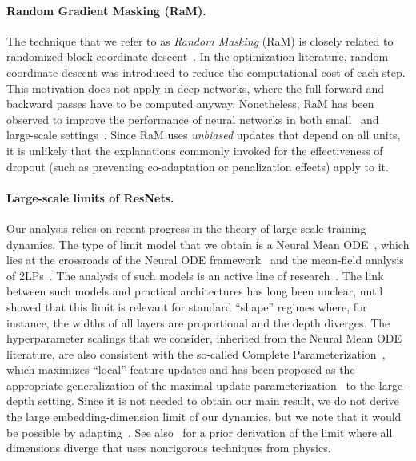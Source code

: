 \documentclass[a4paper,11pt]{article}
\newcommand{\1}{\mathbbm{1}}
\theoremstyle{definition}
\theoremstyle{remark}
\begin{document}
\paragraph{Random Gradient Masking (RaM).} 
The technique that we refer to as \emph{Random Masking} (RaM) is closely related to randomized block-coordinate descent~\cite{nesterov2012coordinatedescent,cotter2011betterminibatch,Wright2015CoordinateDA}. In the optimization literature, random coordinate descent was introduced to reduce the computational cost of each step. This motivation does not apply in deep networks, where the full forward and backward passes have to be computed anyway. Nonetheless, RaM has been observed to improve the performance of neural networks in both small~\cite{chizat2025phasediagramdropouttwolayer} and large-scale settings~\cite{joo2026surprisingeffectivenessmaskingupdates}. Since RaM uses \emph{unbiased} updates that depend on all units, it is unlikely that the explanations commonly invoked for the effectiveness of dropout (such as preventing co-adaptation or penalization effects) apply to it.

\paragraph{Large-scale limits of ResNets.}
Our analysis relies on recent progress in the theory of large-scale training dynamics. 
The type of limit model that we obtain is a Neural Mean ODE~\cite{lu2020meanfieldanalysisdeepresnet,ding2022mfresnets}, which lies at the crossroads of the Neural ODE framework~\cite{weinan2017proposal,chen2019neuralordinarydifferentialequations,lu2020meanfieldanalysisdeepresnet} and the mean-field analysis of 2LPs~\cite{nitanda2017stochastic,chizat2018globalconvergencegradientdescent,MeiMontanari2018mftwolayernetworks,sirignano2019meanfieldanalysisneural,Rotskoff2022mflimit}. The analysis of such models is an active line of research~\cite{jabir2019mean,isobe2023convergence,barboni2023globalconvergenceresnetsfinite,bonnet2023measure,barboni2025understandingtraininginfinitelydeep,daudin2025genericity,gassiat2025gradient}. The link between such models and practical architectures has long been unclear, until~\cite{chizat2025hidden} showed that this limit is relevant for standard ``shape'' regimes where, for instance, the widths of all layers are proportional and the depth diverges. The hyperparameter scalings that we consider, inherited from the Neural Mean ODE literature, are also consistent with the so-called  Complete Parameterization~\cite{dey2026dontlazycompletepenables}, which maximizes ``local'' feature updates and has been proposed as the appropriate generalization of the maximal update parameterization~\cite{yang2021tensorprogramsIV} to the large-depth setting. Since it is not needed to obtain our main result, we do not derive the large embedding-dimension limit of our dynamics, but we note that it would be possible by adapting~\cite{chaintron2026resnetsshapessizesconvergence}. See also~\cite{bordelon2024infinitelimitsmultiheadtransformer} for a prior derivation of the limit where all dimensions diverge that uses nonrigorous techniques from physics.
\end{document}
